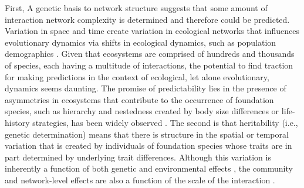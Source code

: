 \documentclass[fleqn,12pt]{olplainarticle}
\begin{document}
First, A genetic basis to network structure suggests that some amount
of interaction network complexity is determined and therefore could be
predicted. Variation in space and time create variation in ecological
networks that influences evolutionary dynamics via shifts in
ecological dynamics, such as population demographics
\citep{Guimaraes2020TheOrganization}. Given that ecosystems are
comprised of hundreds and thousands of species, each having a
multitude of interactions, the potential to find traction for making
predictions in the context of ecological, let alone evolutionary,
dynamics seems daunting. The promise of predictability lies in the
presence of asymmetries in ecosystems that contribute to the
occurrence of foundation species, such as hierarchy and nestedness
created by body size differences or life-history strategies, has been
widely observed \citep{Ellison2005}. The second is that heritability
(i.e., genetic determination) means that there is structure in the
spatial or temporal variation that is created by individuals of
foundation species whose traits are in part determined by underlying
trait differences. Although this variation is inherently a function of
both genetic and environmental effects \citep{Conner2004ATextbook},
the community and network-level effects are also a function of the
scale of the interaction \citep{Shuster2006COMMUNITYSTRUCTURE}.
\end{document}
